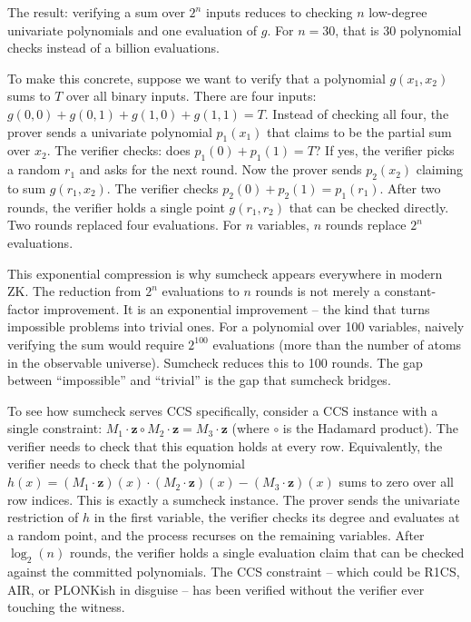 \documentclass[
  11pt,
  openany]{report}
\begin{document}
The result: verifying a sum over \(2^n\) inputs reduces to checking \(n\)
low-degree univariate polynomials and one evaluation of \(g\). For \(n = 30\),
that is 30 polynomial checks instead of a billion evaluations.

To make this concrete, suppose we want to verify that a polynomial
\(g(x_1, x_2)\) sums to \(T\) over all binary inputs. There are four inputs:
\(g(0,0) + g(0,1) + g(1,0) + g(1,1) = T\). Instead of checking all four, the
prover sends a univariate polynomial \(p_1(x_1)\) that claims to be the partial
sum over \(x_2\). The verifier checks: does \(p_1(0) + p_1(1) = T\)? If yes, the
verifier picks a random \(r_1\) and asks for the next round. Now the prover
sends \(p_2(x_2)\) claiming to sum \(g(r_1, x_2)\). The verifier checks
\(p_2(0) + p_2(1) = p_1(r_1)\). After two rounds, the verifier holds a single
point \(g(r_1, r_2)\) that can be checked directly. Two rounds replaced four
evaluations. For \(n\) variables, \(n\) rounds replace \(2^n\) evaluations.

This exponential compression is why sumcheck appears everywhere in modern ZK.
The reduction from \(2^n\) evaluations to \(n\) rounds is not merely a
constant-factor improvement. It is an exponential improvement -- the kind that
turns impossible problems into trivial ones. For a polynomial over 100
variables, naively verifying the sum would require \(2^{100}\) evaluations (more
than the number of atoms in the observable universe). Sumcheck reduces this to
100 rounds. The gap between ``impossible'' and ``trivial'' is the gap that
sumcheck bridges.

To see how sumcheck serves CCS specifically, consider a CCS instance with a
single constraint:
\(M_1 \cdot \mathbf{z} \circ M_2 \cdot \mathbf{z} = M_3 \cdot \mathbf{z}\)
(where \(\circ\) is the Hadamard product). The verifier needs to check that this
equation holds at every row. Equivalently, the verifier needs to check that the
polynomial
\(h(x) = (M_1 \cdot \mathbf{z})(x) \cdot (M_2 \cdot \mathbf{z})(x) - (M_3 \cdot \mathbf{z})(x)\)
sums to zero over all row indices. This is exactly a sumcheck instance. The
prover sends the univariate restriction of \(h\) in the first variable, the
verifier checks its degree and evaluates at a random point, and the process
recurses on the remaining variables. After \(\log_2(n)\) rounds, the verifier
holds a single evaluation claim that can be checked against the committed
polynomials. The CCS constraint -- which could be R1CS, AIR, or PLONKish in
disguise -- has been verified without the verifier ever touching the witness.
\end{document}
